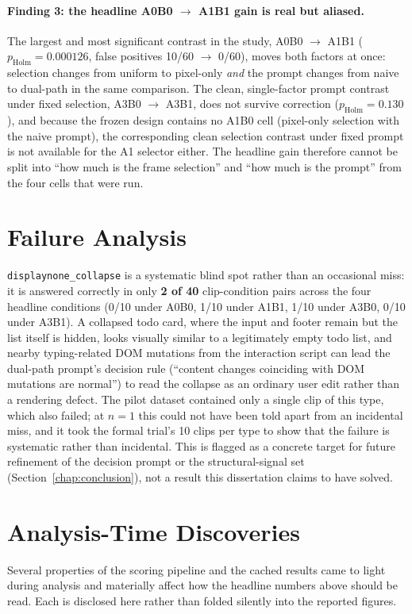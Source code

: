 \paragraph{Finding 3: the headline A0B0 $\to$ A1B1 gain is real but aliased.} The largest and most significant contrast in the study, A0B0 $\to$ A1B1 ($p_\text{Holm}=0.000126$, false positives 10/60 $\to$ 0/60), moves both factors at once: selection changes from uniform to pixel-only \emph{and} the prompt changes from naive to dual-path in the same comparison. The clean, single-factor prompt contrast under fixed selection, A3B0 $\to$ A3B1, does not survive correction ($p_\text{Holm}=0.130$), and because the frozen design contains no A1B0 cell (pixel-only selection with the naive prompt), the corresponding clean selection contrast under fixed prompt is not available for the A1 selector either. The headline gain therefore cannot be split into ``how much is the frame selection'' and ``how much is the prompt'' from the four cells that were run.

\section{Failure Analysis}
\label{sec:results-failure}
\texttt{displaynone\_collapse} is a systematic blind spot rather than an occasional miss: it is answered correctly in only \textbf{2 of 40} clip-condition pairs across the four headline conditions (0/10 under A0B0, 1/10 under A1B1, 1/10 under A3B0, 0/10 under A3B1). A collapsed todo card, where the input and footer remain but the list itself is hidden, looks visually similar to a legitimately empty todo list, and nearby typing-related DOM mutations from the interaction script can lead the dual-path prompt's decision rule (``content changes coinciding with DOM mutations are normal'') to read the collapse as an ordinary user edit rather than a rendering defect. The pilot dataset contained only a single clip of this type, which also failed; at $n=1$ this could not have been told apart from an incidental miss, and it took the formal trial's 10 clips per type to show that the failure is systematic rather than incidental. This is flagged as a concrete target for future refinement of the decision prompt or the structural-signal set (Section~\ref{chap:conclusion}), not a result this dissertation claims to have solved.

\section{Analysis-Time Discoveries}
\label{sec:results-discoveries}
Several properties of the scoring pipeline and the cached results came to light during analysis and materially affect how the headline numbers above should be read. Each is disclosed here rather than folded silently into the reported figures.

